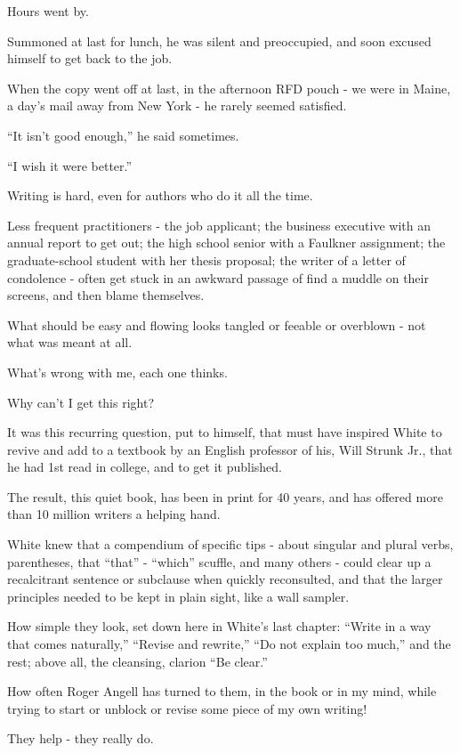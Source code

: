 \documentclass{book}
\numberwithin{equation}{section}
\begin{document}
Hours went by.

Summoned at last for lunch, he was silent and preoccupied, and soon excused himself to get back to the job.

When the copy went off at last, in the afternoon RFD pouch - we were in Maine, a day's mail away from New York - he rarely seemed satisfied.

``It isn't good enough,'' he said sometimes.

``I wish it were better.''

%
Writing is hard, even for authors who do it all the time.

Less frequent practitioners - the job applicant; the business executive with an annual report to get out; the high school senior with a Faulkner assignment; the graduate-school student with her thesis proposal; the writer of a letter of condolence - often get stuck in an awkward passage of find a muddle on their screens, and then blame themselves.

What should be easy and flowing looks tangled or feeable or overblown - not what was meant at all.

What's wrong with me, each one thinks.

Why can't I get this right?

%
It was this recurring question, put to himself, that must have inspired White to revive and add to a textbook by an English professor of his, Will Strunk Jr., that he had 1st read in college, and to get it published.

The result, this quiet book, has been in print for 40 years, and has offered more than 10 million writers a helping hand.

White knew that a compendium of specific tips - about singular and plural verbs, parentheses, that ``that'' - ``which'' scuffle, and many others - could clear up a recalcitrant sentence or subclause when quickly reconsulted, and that the larger principles needed to be kept in plain sight, like a wall sampler.

%
How simple they look, set down here in White's last chapter: ``Write in a way that comes naturally,'' ``Revise and rewrite,'' ``Do not explain too much,'' and the rest; above all, the cleansing, clarion ``Be clear.''

How often Roger Angell has turned to them, in the book or in my mind, while trying to start or unblock or revise some piece of my own writing!

They help - they really do.
\end{document}
